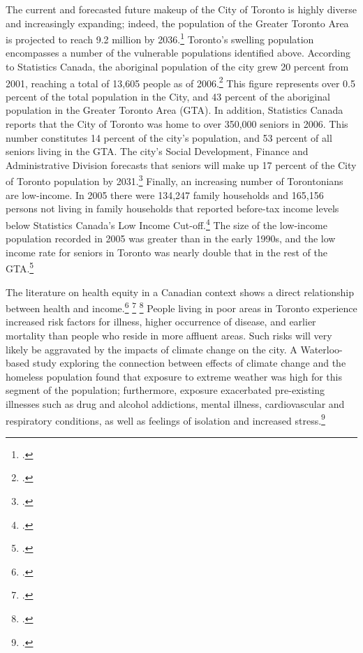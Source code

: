\documentclass[10pt]{article}
\begin{document}
The current and forecasted future makeup of the City of Toronto is highly diverse and increasingly expanding; indeed, the population of the Greater Toronto Area is projected to reach 9.2 million by 2036.\footcite[][]{DemoProjections2012}
Toronto's swelling population encompasses a number of the vulnerable populations identified above. 
According to Statistics Canada, the aboriginal population of the city grew 20 percent from 2001, reaching a total of 13,605 people as of 2006.\footcite[][]{2006TorontoProfile}
This figure represents over 0.5 percent of the total population in the City, and 43 percent of the aboriginal population in the Greater Toronto Area (GTA). 
In addition, Statistics Canada reports that the City of Toronto was home to over 350,000 seniors in 2006.
This number constitutes 14 percent of the city's population, and 53 percent of all seniors living in the GTA. 
The city's Social Development, Finance and Administrative Division forecasts that seniors will make up 17 percent of the City of Toronto population by 2031.\footcite[][p. 5]{SeniorsDemographicSnapshot}
Finally, an increasing number of Torontonians are low-income.
In 2005 there were 134,247 family households and 165,156 persons not living in family households that reported before-tax income levels below Statistics Canada's Low Income Cut-off.\footcite[][p. 5]{LowIncomeProfile}
The size of the low-income population recorded in 2005 was greater than in the early 1990s, and the low income rate for seniors in Toronto was nearly double that in the rest of the GTA.\footcite[][p. 6]{LowIncomeProfile}



The literature on health equity in a Canadian context shows a direct relationship between health and income.\footcite[][]{HotWeatherResponse2006} \footcite[][]{PovertyMakingSick} \footcite[][]{PovertyInequalityHealth}
People living in poor areas in Toronto experience increased risk factors for illness, higher occurrence of disease, and earlier mortality than people who reside in more affluent areas.
Such risks will very likely be aggravated by the impacts of climate change on the city.
A Waterloo-based study exploring the connection between effects of climate change and the homeless population found that exposure to extreme weather was high for this segment of the population; furthermore, exposure exacerbated pre-existing illnesses such as drug and alcohol addictions, mental illness, cardiovascular and respiratory conditions, as well as feelings of isolation and increased stress.\footcite[][]{HomelessnessWaterloo}
\end{document}
